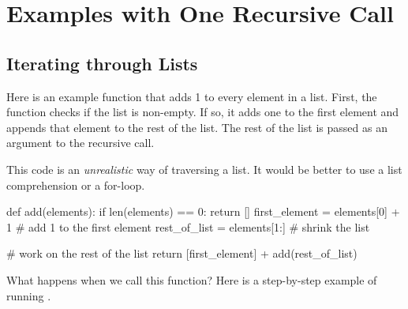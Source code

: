 \documentclass[11pt]{cselabheader}
\begin{document}
\section{Examples with One Recursive Call}
\subsection{Iterating through Lists}

Here is an example function that adds 1 to every element in a list.
First, the function checks if the list is non-empty. If so, it adds
one to the first element and appends that element to the rest of
the list. The rest of the list is passed as an argument to the
recursive call.

This code is an \textsl{unrealistic} way of traversing a list. It
would be better to use a list comprehension or a for-loop.

\begin{python3code}
def add(elements):
    if len(elements) == 0:
        return []
    first_element = elements[0] + 1  # add 1 to the first element
    rest_of_list = elements[1:]  # shrink the list

    # work on the rest of the list
    return [first_element] + add(rest_of_list)
\end{python3code}

What happens when we call this function? Here is a step-by-step
example of running .
\end{document}
